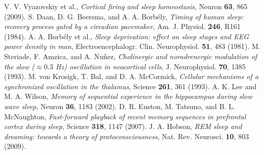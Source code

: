  V. V. Vyazovskiy et al., \emph{Cortical firing and sleep homeostasis}, Neuron \textbf{63}, 865 (2009).
 S. Daan, D. G. Beersma, and A. A. Borb\'ely, \emph{Timing of human sleep: recovery process gated by a circadian pacemaker}, Am. J. Physiol. \textbf{246}, R161 (1984).
 A. A. Borb\'ely et al., \emph{Sleep deprivation: effect on sleep stages and EEG power density in man}, Electroencephalogr. Clin. Neurophysiol. \textbf{51}, 483 (1981).
 M. Steriade, F. Amzica, and A. Nu\~nez, \emph{Cholinergic and noradrenergic modulation of the slow ($\approx0.3$ Hz) oscillation in neocortical cells}, J. Neurophysiol. \textbf{70}, 1385 (1993).
 M. von Krosigk, T. Bal, and D. A. McCormick, \emph{Cellular mechanisms of a synchronized oscillation in the thalamus}, Science \textbf{261}, 361 (1993).
 A. K. Lee and M. A. Wilson, \emph{Memory of sequential experience in the hippocampus during slow wave sleep}, Neuron \textbf{36}, 1183 (2002).
 D. R. Euston, M. Tatsuno, and B. L. McNaughton, \emph{Fast-forward playback of recent memory sequences in prefrontal cortex during sleep}, Science \textbf{318}, 1147 (2007).
 J. A. Hobson, \emph{REM sleep and dreaming: towards a theory of protoconsciousness}, Nat. Rev. Neurosci. \textbf{10}, 803 (2009).

